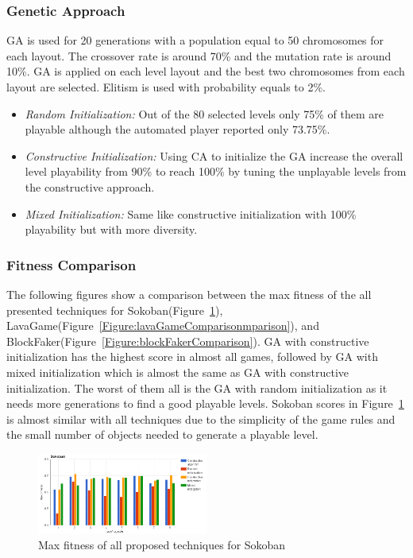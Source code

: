 \documentclass[letterpaper]{article}
\newcommand{\figref}[1]{Figure~\ref{Figure:#1}}
\begin{document}
\subsubsection{Genetic Approach}
GA is used for 20 generations with a population equal to 50 chromosomes for each layout. The crossover rate is around 70\% and the mutation rate is around 10\%. GA is applied on each level layout and the best two chromosomes from each layout are selected. Elitism is used with probability equals to 2\%.
\begin{itemize}
	\item \emph{Random Initialization:} Out of the 80 selected levels only 75\% of them are playable although the automated player reported only 73.75\%.
	\item \emph{Constructive Initialization:} Using CA to initialize the GA increase the overall level playability from 90\% to reach 100\% by tuning the unplayable levels from the constructive approach.
	\item \emph{Mixed Initialization:} Same like constructive initialization with 100\% playability but with more diversity.
\end{itemize}

\subsubsection{Fitness Comparison}
The following figures show a comparison between the max fitness of the all presented techniques for Sokoban(\figref{sokobanComparison}), LavaGame(\figref{lavaGameComparisonmparison}), and BlockFaker(\figref{blockFakerComparison}). GA with constructive initialization has the highest score in almost all games, followed by GA with mixed initialization which is almost the same as GA with constructive initialization. The worst of them all is the GA with random initialization as it needs more generations to find a good playable levels. Sokoban scores in \figref{sokobanComparison} is almost similar with all techniques due to the simplicity of the game rules and the small number of objects needed to generate a playable level.

\begin{figure}[ht]
  	\centering
    \includegraphics[width=0.5\textwidth]{Images/sokobanComparison}
    \caption{Max fitness of all proposed techniques for Sokoban}
    \label{Figure:sokobanComparison}
\end{figure}
\end{document}
